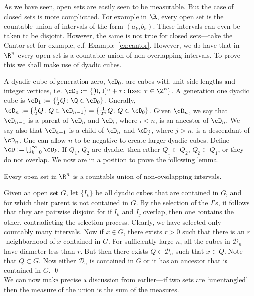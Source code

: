 As we have seen, open sets are easily seen to be measurable. But the case of closed sets is more complicated. For example in $\R$, every open set is the countable union of intervals of the form $(a_k,b_k)$. These intervals can even be taken to be disjoint. However, the same is not true for closed sets---take the Cantor set for example, c.f. Example~\ref{ex:cantor}. However, we do have that in $\R^n$ every open set is a countable union of non-overlapping intervals. To prove this we shall make use of dyadic cubes.


A dyadic cube of generation zero, $\cD_0$, are cubes with unit side lengths and integer vertices, i.e. $\cD_0:=\{[0,1]^n + \tau \colon \text{fixed } \tau \in \Z^n\}$. A generation one dyadic cube is $\cD_1:= \{\frac{1}{2}Q \colon \Q \in \cD_0\}$. Gnerally, $\cD_n:= \{\frac{1}{2} Q \colon Q \in \cD_{n-1}\}=\{\frac{1}{2^n}Q \colon Q \in \cD_0\}$. Given $\cD_n$, we say that $\cD_{n-1}$ is a parent of $\cD_n$ and $\cD_i$, where $i<n$, is an ancestor of $\cD_n$. We say also that $\cD_{n+1}$ is a child of $\cD_n$ and $\cD_j$, where $j>n$, is a descendant of $\cD_n$. One can allow $n$ to be negative to create larger dyadic cubes. Define $\cD:= \bigcup_{k=0}^\infty \cD_k$. If $Q_1$, $Q_2$ are dyadic, then either $Q_1 \subset Q_2$, $Q_2 \subset Q_1$, or they do not overlap. We now are in a position to prove the following lemma. 


\begin{lem} \label{lem:tiling}
Every open set in $\R^n$ is a countable union of non-overlapping intervals. 
\end{lem}

\pf Given an open set $G$, let $\{I_k\}$ be all dyadic cubes that are contained in $G$, and for which their parent is not contained in $G$. By the selection of the $I$'s, it follows that they are pairwise disjoint for if $I_k$ and $I_j$ overlap, then one contains the other, contradicting the selection process. Clearly, we have selected only countably many intervals. Now if $x \in G$, there exists $r>0$ such that there is an $r$-neighborhood of $x$ contained in $G$. For sufficiently large $n$, all the cubes in $\mathcal{D}_n$ have diameter less than $r$. But then there exists $Q \in \mathcal{D}_n$ such that $x \in Q$. Note that $Q \subset G$. Now either $\mathcal{D}_n$ is contained in $G$ or it has an ancestor that is contained in $G$. \qed \\



We can now make precise a discussion from earlier---if two sets are `unentangled' then the measure of the union is the sum of the measures. 


